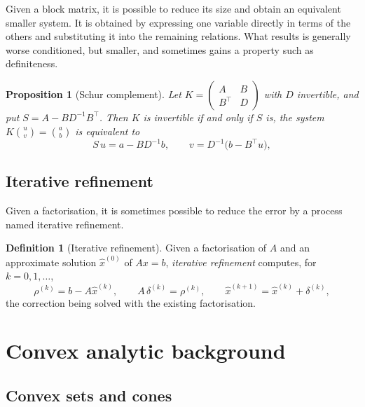 \documentclass[a4paper,11pt]{book}
\theoremstyle{plain}
\newtheorem{proposition}[theorem]{Proposition}
\theoremstyle{definition}
\newtheorem{definition}[theorem]{Definition}
\theoremstyle{remark}
\numberwithin{equation}{chapter}
\numberwithin{algorithm}{chapter}
\begin{document}
	Given a block matrix, it is possible to reduce its size and obtain an
	equivalent smaller system. It is obtained by expressing one variable directly
	in terms of the others and substituting it into the remaining relations. What
	results is generally worse conditioned, but smaller, and sometimes gains a
	property such as definiteness.
	
	\begin{proposition}[Schur complement]
		Let $K=\begin{pmatrix}A&B\\ B^\top&D\end{pmatrix}$ with $D$ invertible, and put
		$S=A-BD^{-1}B^\top$. Then $K$ is invertible if and only if $S$ is, the system
		$K\binom{u}{v}=\binom{a}{b}$ is equivalent to
		\begin{equation}
			S\,u=a-BD^{-1}b,
			\qquad
			v=D^{-1}\bigl(b-B^\top u\bigr) ,
		\end{equation}
		
	\end{proposition}
	
	\section{Iterative refinement}
	
	Given a factorisation, it is sometimes possible to reduce the error by a
	process named iterative refinement.
	
	\begin{definition}[Iterative refinement]
		Given a factorisation of $A$ and an approximate solution $\hat x^{(0)}$ of
		$Ax=b$, \emph{iterative refinement} computes, for $k=0,1,\dots$,
		\begin{equation}
			\rho^{(k)}=b-A\hat x^{(k)},
			\qquad
			A\,\delta^{(k)}=\rho^{(k)},
			\qquad
			\hat x^{(k+1)}=\hat x^{(k)}+\delta^{(k)} ,
		\end{equation}
		the correction being solved with the existing factorisation.
	\end{definition}
	
	\chapter{Convex analytic background}
	
	\section{Convex sets and cones}
	
\end{document}
